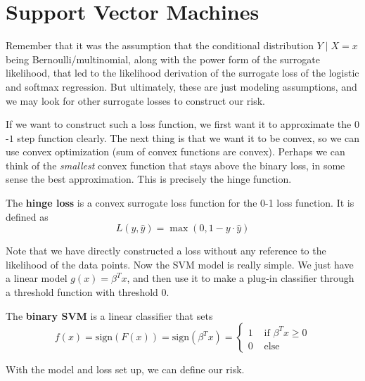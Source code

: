 \section{Support Vector Machines} 

  Remember that it was the assumption that the conditional distribution $Y \mid X = x$ being Bernoulli/multinomial, along with the power form of the surrogate likelihood, that led to the likelihood derivation of the surrogate loss of the logistic and softmax regression. But ultimately, these are just modeling assumptions, and we may look for other surrogate losses to construct our risk. 

  If we want to construct such a loss function, we first want it to approximate the $0$-$1$ step function clearly. The next thing is that we want it to be convex, so we can use convex optimization (sum of convex functions are convex). Perhaps we can think of the \textit{smallest} convex function that stays above the binary loss, in some sense the best approximation. This is precisely the hinge function. 

  \begin{definition}
    The \textbf{hinge loss} is a convex surrogate loss function for the 0-1 loss function. It is defined as 
    \begin{equation}
      L(y, \hat{y}) = \max(0, 1 - y \cdot \hat{y})
    \end{equation}
  \end{definition} 

  Note that we have directly constructed a loss without any reference to the likelihood of the data points. Now the SVM model is really simple. We just have a linear model $g(x) = \beta^T x$, and then use it to make a plug-in classifier through a threshold function with threshold $0$. 

  \begin{definition}
    The \textbf{binary SVM} is a linear classifier that sets 
    \begin{equation}
      f(x) = \mathrm{sign}(F(x)) = \mathrm{sign}(\beta^T x) = \begin{cases} 
        1 & \text{ if } \beta^T x \geq 0 \\
        0 & \text{ else}
      \end{cases}
    \end{equation}
  \end{definition} 

  With the model and loss set up, we can define our risk.


